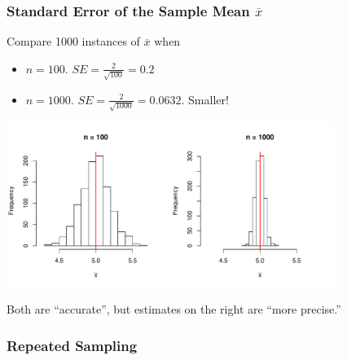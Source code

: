 \documentclass[slides]{beamer}
\newcommand{\blue}[1]{\textcolor{blue2}{#1}}
\newcommand{\xbar}{\overline{x}}
\begin{document}
%
\begin{frame}[fragile]
\frametitle{Standard Error of the Sample Mean $\xbar$}
Compare 1000 instances of $\xbar$ when 
\begin{itemize}
\pause \item $n=100$. $SE = \frac{2}{\sqrt{100}} = 0.2$
\pause \item $n=1000$. $SE = \frac{2}{\sqrt{1000}} = 0.0632$.  \blue{Smaller}!
\end{itemize}

\begin{center}
\pause \includegraphics[width=0.8\textwidth]{figure/compare}
\end{center}
\pause Both are ``accurate'', but estimates on the right are ``more precise.''

\end{frame}


\begin{frame}[fragile]
\frametitle{Repeated Sampling}
%
%
%
%
%
%

\end{frame}
\end{document}
